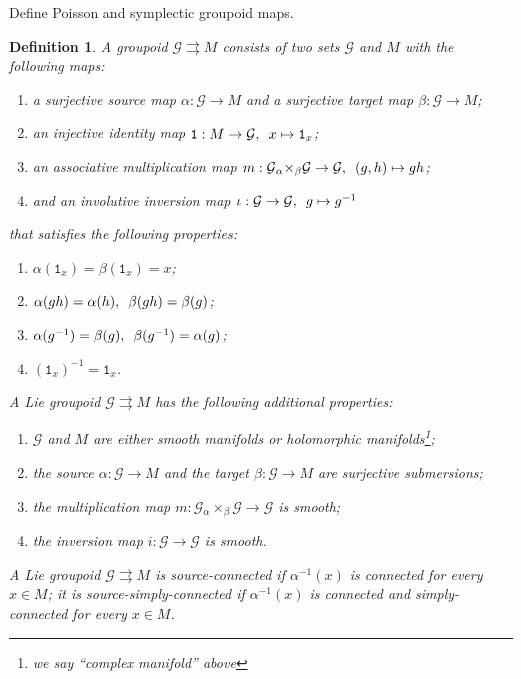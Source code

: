 \documentclass{amsart}
\newtheorem{definition}[theorem]{Definition}
\numberwithin{equation}{section}
\newcommand{\cG}{\mathcal{G}}
\begin{document}
{\color{red} Define Poisson and symplectic groupoid maps.}


\begin{definition}
  A groupoid $\cG \rightrightarrows M$ consists of two sets $\cG$ and $M$ with the following maps:
  \begin{enumerate}
    \item a surjective source map $\alpha: \cG \to M$ and a surjective target map $\beta: \cG \to M$;
    \item an injective identity map $\mathtt{1}: M \to \cG, \enskip x \mapsto \mathtt{1}_x$;
    \item an associative multiplication map $m: \cG {_\alpha \times_\beta} \cG \to \cG, \enskip (g, h) \mapsto gh$;
    \item and an involutive inversion map $\iota: \cG \to \cG, \enskip g \mapsto g^{-1}$
  \end{enumerate}
  that satisfies the following properties:
  \begin{enumerate}
    \item $\alpha(\mathtt{1}_x) = \beta(\mathtt{1}_x) = x$;
    \item $\alpha(gh) = \alpha(h), \enskip \beta(gh) = \beta(g)$;
    \item $\alpha(g^{-1}) = \beta(g), \enskip \beta(g^{-1}) = \alpha(g)$;
    \item $(\mathtt{1}_x)^{-1} = \mathtt{1}_x$.
  \end{enumerate}
  A Lie groupoid $\cG \rightrightarrows M$ has the following additional properties:
  \begin{enumerate}
    \item $\cG$ and $M$ are either smooth manifolds or holomorphic manifolds\footnote{we say ``complex manifold'' above};
    \item the source $\alpha: \cG \to M$ and the target $\beta: \cG \to M$ are surjective submersions;
    \item the multiplication map $m: \cG {_\alpha \times_\beta} \cG \to \cG$ is smooth;
    \item the inversion map $i: \cG \to \cG$ is smooth.
  \end{enumerate}
  A Lie groupoid $\cG \rightrightarrows M$ is source-connected if $\alpha^{-1}(x)$ is connected for every $x \in M$; it is source-simply-connected if $\alpha^{-1}(x)$ is connected and simply-connected for every $x \in M$.
\end{definition}
\end{document}
